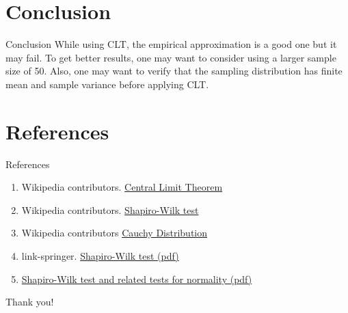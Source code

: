 \documentclass[10pt]{beamer}
\begin{document}
\section{Conclusion}
\begin{frame}{Conclusion}
    While using CLT, the empirical approximation is a good one but it may fail. To get better results, one may want to consider using a larger sample size of 50. Also, one may want to verify that the sampling distribution has finite mean and sample variance before applying CLT.
\end{frame}

\section{References}
\begin{frame}{References}
\begin{enumerate}
    \item Wikipedia contributors. \href{https://en.wikipedia.org/wiki/Central_limit_theorem}{Central Limit Theorem}
    \item Wikipedia contributors. \href{https://en.wikipedia.org/wiki/Shapiro\%E2\%80\%93Wilk_test}{Shapiro-Wilk test}
    \item Wikipedia contributors \href{https://en.wikipedia.org/wiki/Cauchy_distribution}{Cauchy Distribution}
    \item link-springer. \href{https://link.springer.com/content/pdf/bbm\%3A978-1-4684-0167-7\%2F1.pdf}{Shapiro-Wilk test (pdf)}
    \item \href{https://math.mit.edu/~rmd/465/shapiro.pdf}{Shapiro-Wilk test and related tests for normality (pdf)}
\end{enumerate}
\end{frame}

\begin{frame}
\textcolor{myNewColorA}{\Huge{\centerline{Thank you!}}}
\end{frame}
\end{document}
